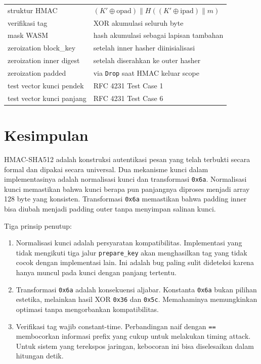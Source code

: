 \documentclass[11pt,a4paper]{article}
\begin{document}
\begin{table}[H]
\begin{tabularx}{\textwidth}{l X}
		struktur HMAC             & $(K' \oplus \text{opad}) \parallel H((K' \oplus \text{ipad}) \parallel m)$ \\
		verifikasi tag            & XOR akumulasi seluruh byte                                                 \\
		mask WASM                 & hash akumulasi sebagai lapisan tambahan                                    \\
		zeroization block\_key    & setelah inner hasher diinisialisasi                                        \\
		zeroization inner digest  & setelah diserahkan ke outer hasher                                         \\
		zeroization padded        & via \texttt{Drop} saat HMAC keluar scope                                   \\
		test vector kunci pendek  & RFC 4231 Test Case 1                                                       \\
		test vector kunci panjang & RFC 4231 Test Case 6                                                       \\
		\bottomrule
	\end{tabularx}
\end{table}

\section{Kesimpulan}

HMAC-SHA512 adalah konstruksi autentikasi pesan yang telah terbukti secara formal dan dipakai secara universal. Dua mekanisme kunci dalam implementasinya adalah normalisasi kunci dan transformasi \texttt{0x6a}. Normalisasi kunci memastikan bahwa kunci berapa pun panjangnya diproses menjadi array 128 byte yang konsisten. Transformasi \texttt{0x6a} memastikan bahwa padding inner bisa diubah menjadi padding outer tanpa menyimpan salinan kunci.

Tiga prinsip penutup:

\begin{enumerate}
	\item Normalisasi kunci adalah persyaratan kompatibilitas. Implementasi yang tidak mengikuti tiga jalur \texttt{prepare\_key} akan menghasilkan tag yang tidak cocok dengan implementasi lain. Ini adalah bug paling sulit dideteksi karena hanya muncul pada kunci dengan panjang tertentu.
	\item Transformasi \texttt{0x6a} adalah konsekuensi aljabar. Konstanta \texttt{0x6a} bukan pilihan estetika, melainkan hasil XOR \texttt{0x36} dan \texttt{0x5c}. Memahaminya memungkinkan optimasi tanpa mengorbankan kompatibilitas.
	\item Verifikasi tag wajib constant-time. Perbandingan naif dengan \texttt{==} membocorkan informasi prefix yang cukup untuk melakukan timing attack. Untuk sistem yang terekspos jaringan, kebocoran ini bisa diselesaikan dalam hitungan detik.
\end{enumerate}
\end{document}
